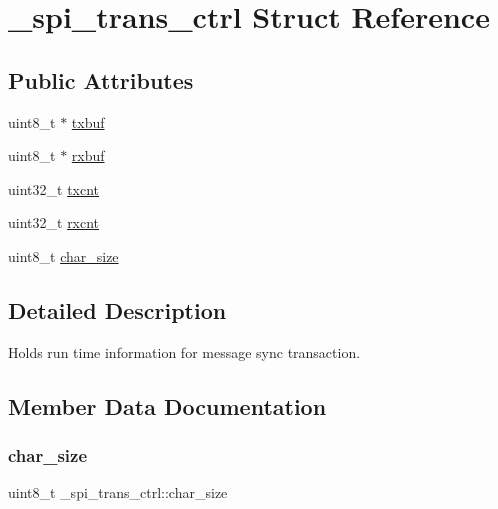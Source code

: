 \hypertarget{struct__spi__trans__ctrl}{}\section{\+\_\+spi\+\_\+trans\+\_\+ctrl Struct Reference}
\label{struct__spi__trans__ctrl}
\subsection*{Public Attributes}
\begin{DoxyCompactItemize}
\item 
uint8\+\_\+t $\ast$ \hyperlink{struct__spi__trans__ctrl_a31fcb8257bb47b3f5f556e73a75488b8}{txbuf}
\item 
uint8\+\_\+t $\ast$ \hyperlink{struct__spi__trans__ctrl_a27e27d3226399d90a8f4a4c9580d1b20}{rxbuf}
\item 
uint32\+\_\+t \hyperlink{struct__spi__trans__ctrl_ac2a7e7b24c384608823b1969dd9650ab}{txcnt}
\item 
uint32\+\_\+t \hyperlink{struct__spi__trans__ctrl_aa7b3bb5420e55e627e0670491b7dfdb3}{rxcnt}
\item 
uint8\+\_\+t \hyperlink{struct__spi__trans__ctrl_ad80067f96ed84f030609caef6cf6cbf8}{char\+\_\+size}
\end{DoxyCompactItemize}


\subsection{Detailed Description}
Holds run time information for message sync transaction. 

\subsection{Member Data Documentation}
\mbox{\label{struct__spi__trans__ctrl_ad80067f96ed84f030609caef6cf6cbf8}} 
\subsubsection{\texorpdfstring{char\+\_\+size}{char\_size}}
{\footnotesize\ttfamily uint8\+\_\+t \+\_\+spi\+\_\+trans\+\_\+ctrl\+::char\+\_\+size}

